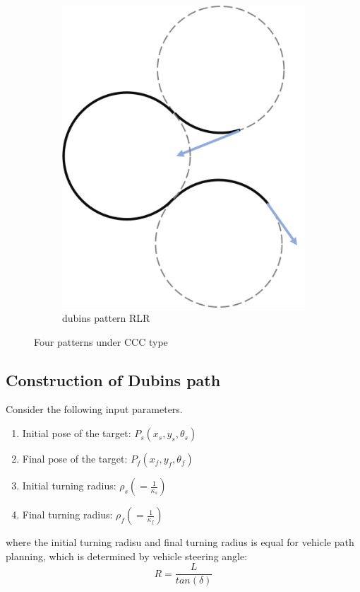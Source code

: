 \begin{figure}
\begin{subfigure}[b]{0.4\textwidth}
         \includegraphics[scale=0.7]{fig/dubins/RLR.png}
         \caption{dubins pattern RLR}
         \label{fig:dubins pattern RLR}
     \end{subfigure}
        \caption{Four patterns under CCC type }
        \label{fig:dubins pattern CCC}
\end{figure}


\subsection{Construction of Dubins path}

Consider the following input parameters.
\begin{enumerate}
\item Initial pose of the target: $P_s\left(x_s, y_s, \theta_s\right)$
\item Final pose of the target: $P_f\left(x_f, y_f, \theta_f\right)$
\item Initial turning radius: $\rho_s\left(=\frac{1}{\kappa_s}\right)$
\item Final turning radius: $\rho_f\left(=\frac{1}{\kappa_f}\right)$
\end{enumerate}
where the initial turning radisu and final turning radius is equal for vehicle path planning, which is determined by vehicle steering angle:
\begin{equation}
    R = \frac{L}{tan(\delta)}
\label{eq: turning radius using delta}
\end{equation}

